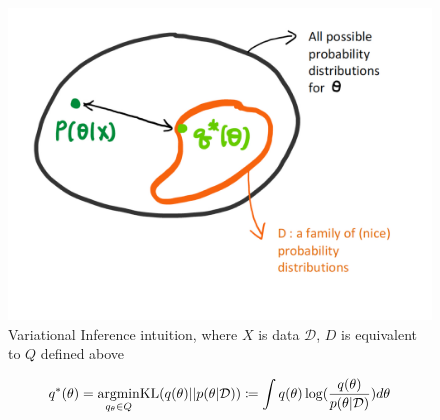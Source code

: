  \begin{figure}[H]
 	\center
 	\includegraphics[scale = 0.2]{VIoptimization}
 	\caption{Variational Inference intuition, where $X$ is data $\mathcal{D}$, $D$ is equivalent to $Q$ defined above}
 	\label{fig:VIoptimization}
 \end{figure}

\begin{equation}
	\label{eq:VI1}
	q^{*}(\theta) = \underset{q_{\theta} \in Q}{\operatorname{argmin}} \textnormal{KL}(q(\theta)||p(\theta|\mathcal{D})) \coloneqq \int q(\theta)\log(\frac{q(\theta)}{p(\theta|\mathcal{D})})d\theta
\end{equation}

